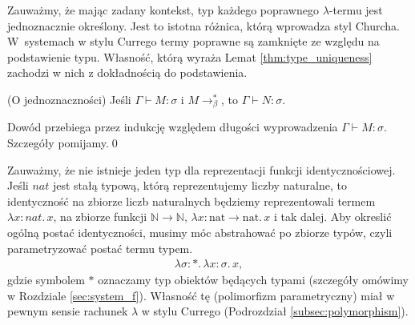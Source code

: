 Zauważmy, że mając zadany kontekst, typ każdego poprawnego \(\lambda\)-termu jest jednoznacznie określony. Jest to istotna różnica, którą wprowadza styl Churcha. W~systemach w stylu Currego termy poprawne są zamknięte ze względu na podstawienie typu. Własność, którą wyraża Lemat \ref{thm:type_uniqueness} zachodzi w nich z dokładnością do podstawienia. 

\begin{lemat}\label{thm:type_uniqueness}(O jednoznaczności)
  Jeśli \(\Gamma\vdash M:\sigma\) i \(M\to^{*}_\beta\), to \(\Gamma\vdash N:\sigma\).
\end{lemat}
\begin{dowod}
  Dowód przebiega przez indukcję względem długości wyprowadzenia \(\Gamma\vdash M:\sigma\). Szczegóły pomijamy.\qed
\end{dowod}

\begin{przyklad}
Zauważmy, że nie istnieje jeden typ dla reprezentacji funkcji identycznościowej. Jeśli \(nat\) jest stałą typową, którą reprezentujemy liczby naturalne, to identyczność na zbiorze liczb naturalnych będziemy reprezentowali termem \(\lambda x:nat.\,x\), na zbiorze funkcji \(\mathbb{N}\to\mathbb{N}\), \(\lambda x:\mathrm{nat}\to\mathrm{nat}.\,x\) i tak dalej.
  Aby okreslić ogólną postać identyczności, musimy móc abstrahować po zbiorze typów, czyli parametryzować postać termu typem. %
      \begin{align*}
        \lambda \sigma:* .\,\lambda x:\sigma.\,x,
      \end{align*}
      gdzie symbolem \(*\) oznaczamy typ obiektów będących typami (szczegóły omówimy w Rozdziale \ref{sec:system_f}).
      Własność tę (polimorfizm parametryczny) miał w pewnym sensie rachunek \(\lambda\) w stylu Currego (Podrozdział \ref{subsec:polymorphism}). 
\end{przyklad}

